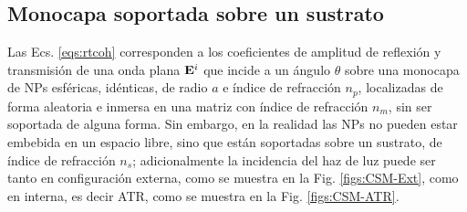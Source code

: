 	 \subsection{Monocapa soportada sobre un sustrato}
\label{ssection:CSMATR}

Las Ecs. \eqref{eqs:rtcoh} corresponden a los coeficientes de amplitud de reflexión y transmisión de una onda plana $\vb{E}^i$ que incide a un ángulo $\theta$ sobre una monocapa de NPs esféricas, idénticas, de radio $a$ e índice de refracción $n_p$, localizadas de forma aleatoria e inmersa en una matriz con índice de refracción $n_m$, sin ser soportada de alguna forma. Sin embargo, en la realidad las NPs no pueden estar embebida en un espacio libre, sino que están soportadas sobre un sustrato, de índice de refracción $n_s$; adicionalmente la incidencia del haz de luz puede ser tanto en configuración externa, como se muestra en la Fig. \ref{figs:CSM-Ext}, como en interna, es decir ATR, como se muestra en la Fig. \ref{figs:CSM-ATR}.


